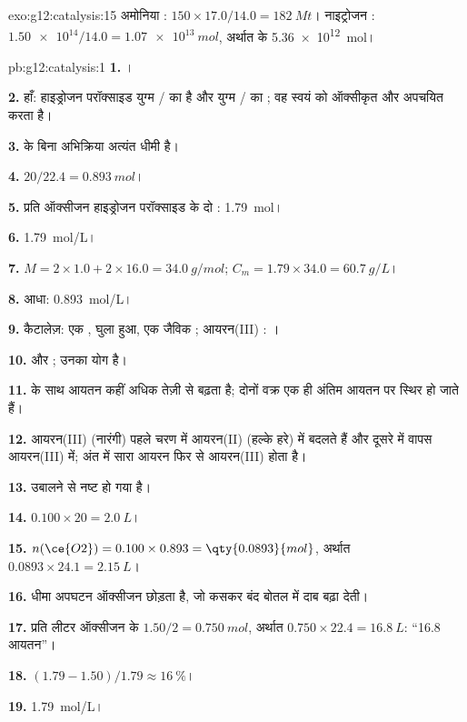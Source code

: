 \begin{solution}{exo:g12:catalysis:15}
अमोनिया : $150 \times 17.0 / 14.0 = \qty{182}{Mt}$। नाइट्रोजन
: $\num{1.50e14} / 14.0 = \qty{1.07e13}{mol}$, अर्थात
 के \qty{5.36e12}{mol}।
\end{solution}

\begin{solution}{pb:g12:catalysis:1}
\textbf{1.} ।

\textbf{2.} हाँ: हाइड्रोजन परॉक्साइड युग्म
/ का  है और युग्म / का ; वह
स्वयं को ऑक्सीकृत और अपचयित करता है।

\textbf{3.}  के बिना अभिक्रिया अत्यंत धीमी है।

\textbf{4.} $20 / 22.4 = \qty{0.893}{mol}$।

\textbf{5.} प्रति  ऑक्सीजन हाइड्रोजन परॉक्साइड के दो :
\qty{1.79}{mol}।

\textbf{6.} \qty{1.79}{mol/L}।

\textbf{7.} $M = 2 \times 1.0 + 2 \times 16.0 = \qty{34.0}{g/mol}$;
$C_m = 1.79 \times 34.0 = \qty{60.7}{g/L}$।

\textbf{8.} आधा: \qty{0.893}{mol/L}।

\textbf{9.} कैटालेज़: एक , घुला हुआ, एक जैविक ;
आयरन(III) : ।

\textbf{10.}  और
; उनका योग
 है।

\textbf{11.}  के साथ आयतन कहीं अधिक तेज़ी से बढ़ता है; दोनों वक्र
एक ही अंतिम आयतन पर स्थिर हो जाते हैं।

\textbf{12.} आयरन(III)  (नारंगी) पहले चरण में आयरन(II) (हल्के
हरे) में बदलते हैं और दूसरे में वापस आयरन(III) में; अंत में
सारा आयरन फिर से आयरन(III) होता है।

\textbf{13.} उबालने से  नष्ट हो गया है।

\textbf{14.} $0.100 \times 20 = \qty{2.0}{L}$।

\textbf{15.} $n(\ce{O2}) = 0.100 \times 0.893 = \qty{0.0893}{mol}$, अर्थात
$0.0893 \times 24.1 = \qty{2.15}{L}$।

\textbf{16.} धीमा अपघटन ऑक्सीजन छोड़ता है, जो कसकर बंद बोतल में
दाब बढ़ा देती।

\textbf{17.} प्रति लीटर ऑक्सीजन के $1.50 / 2 = \qty{0.750}{mol}$, अर्थात
$0.750 \times 22.4 = \qty{16.8}{L}$: ``16.8 आयतन''।

\textbf{18.} $(1.79 - 1.50)/1.79 \approx \qty{16}{\percent}$।

\textbf{19.} \qty{1.79}{mol/L}।
\end{solution}
